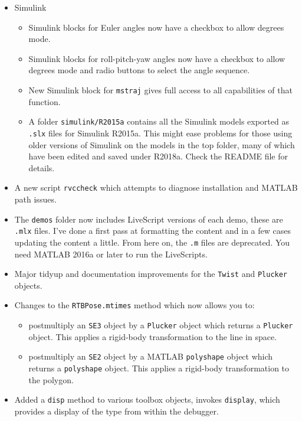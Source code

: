 \documentclass[a4paper,twoside]{report}
\begin{document}
\begin{itemize}
\item Simulink
\begin{itemize}
\item Simulink blocks for Euler angles now have a checkbox to allow degrees mode.
\item Simulink blocks for roll-pitch-yaw angles now have a checkbox to allow degrees mode and radio buttons to select the angle sequence.
\item New Simulink block for \texttt{mstraj} gives full access to all capabilities of that function.
\item A folder \texttt{simulink/R2015a} contains all the Simulink models exported as \texttt{.slx} files for Simulink R2015a.  This might
ease problems for those using older versions of Simulink on the models in the top folder, many of which have been edited and saved
under R2018a.  Check the README file for details.


\end{itemize}

\item A new script \texttt{rvccheck} which attempts to diagnose installation and MATLAB path issues.
\item The \texttt{demos} folder now includes  LiveScript versions of  each demo, these are \texttt{.mlx} files.
  I've done a first pass at formatting the content and in a few cases updating the content a little.  From here on, the \texttt{.m} files are 
  deprecated.  You need MATLAB 2016a or later to run the LiveScripts.
\item Major tidyup and documentation improvements for the \texttt{Twist} and \texttt{Plucker} objects.

\item Changes to the \texttt{RTBPose.mtimes} method which now allows you to:
\begin{itemize}
	\item postmultiply an \texttt{SE3} object by a \texttt{Plucker} object which returns a \texttt{Plucker} object.  This applies a rigid-body transformation to the line in space.
	\item postmultiply an \texttt{SE2} object by a MATLAB \texttt{polyshape} object which returns a  \texttt{polyshape} object.  This applies a rigid-body transformation to the polygon.
\end{itemize}
\item  Added a \texttt{disp} method to various toolbox objects, invokes \texttt{display}, which provides a display of the type from within the  debugger.


\end{itemize}
\end{document}
